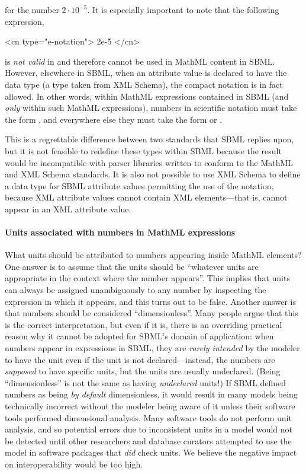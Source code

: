 for the number $2 \cdot 10^{-5}$.  It is especially
important to note that the following expression,

\begin{example}
<cn type="e-notation"> 2e-5 </cn>
\end{example}

is \emph{not valid} in \mathmltwo and therefore cannot be used in
MathML content in SBML.  However, elsewhere in SBML, when an
attribute value is declared to have the data type
 (a type taken from XML Schema), the compact
notation  is in fact allowed.  In other words, within
MathML expressions contained in SBML (and \emph{only} within such
MathML expressions), numbers in scientific notation must take the
form , and
everywhere else they must take the form  or .

This is a regrettable difference between two standards that SBML
replies upon, but it is not feasible to redefine these types
within SBML because the result would be incompatible with parser
libraries written to conform to the MathML and XML Schema
standards.  It is also not possible to use XML Schema to define a
data type for SBML attribute values permitting the use of the
 notation, because XML attribute values cannot
contain XML elements---that is,  cannot appear in an
XML attribute value.


\paragraph{Units associated with numbers in MathML  expressions}
\label{sec:units-of-mathml}

What units should be attributed to numbers appearing inside MathML
 elements?  One answer is to assume that the units
should be ``whatever units are appropriate in the context where the
number appears''.  This implies that units can always be assigned
unambiguously to any number by inspecting the expression in which
it appears, and this turns out to be false.  Another answer is
that numbers should be considered ``dimensionless''.  Many people
argue that this is the correct interpretation, but even if it is,
there is an overriding practical reason why it cannot be adopted
for SBML's domain of application: when numbers appear in
expressions in SBML, they are \emph{rarely intended} by the
modeler to have the unit  even if the unit is
not declared---instead, the numbers are \emph{supposed} to have
specific units, but the units are usually undeclared.  (Being
``dimensionless'' is not the same as having \emph{undeclared}
units!)  If SBML defined numbers as being \emph{by default}
dimensionless, it would result in many models being technically
incorrect without the modeler being aware of it unless their
software tools performed dimensional analysis.  Many software
tools do not perform unit analysis, and so potential errors due to
inconsistent units in a model would not be detected until other
researchers and database curators attempted to use the model in
software packages that \emph{did} check units.  We believe the
negative impact on interoperability would be too high.

